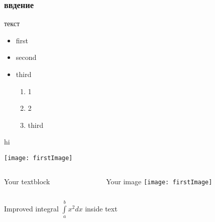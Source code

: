 \documentclass[notes,compress]{beamer}
\begin{document}
    \begin{frame}
        \frametitle{ввдение}
        {\Huge текст}
        \begin{itemize}
          \item<+-> first
          \item<+-> second
          \item<+-> third

            \begin{enumerate}
              \item<1-> 1
              \item<1-2> \alert<5-> {2}
              \item<3-> third
            \end{enumerate}
        \end{itemize}
         {hi}
    \end{frame}

    \begin{frame}
        \texttt{[image: firstImage]}
    \end{frame}

    \begin{frame}
    	\begin{columns}[T]
        	\begin{column}{.5\textwidth}
            	Your textblock
           	
        	\end{column}
        	\begin{column}{.5\textwidth}
            	\begin{block}{Your image}
                	\texttt{[image: firstImage]}
            	\end{block}
        	\end{column}
    	\end{columns}
	\end{frame}

    \begin{frame}
        Improved integral $\int\limits_{a}^{b} x^2 dx$ inside text
    \end{frame}
\end{document}
